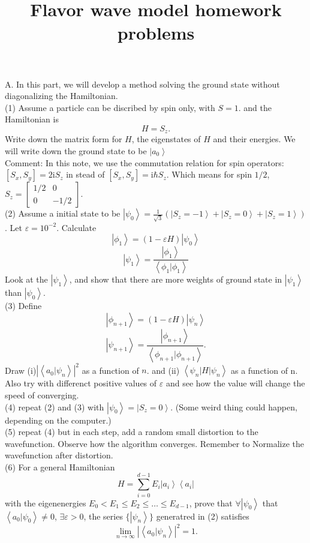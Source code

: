 \documentclass[letter]{article}
\title{{\myfont Flavor wave model homework problems}}
\newcommand{\ii}{\mathrm{i}}
\begin{document}
\maketitle
\indent A. In this part, we will develop a method solving the ground state without diagonalizing the Hamiltonian.\\
\indent (1)  Assume a particle can be discribed by spin only, with $S=1$. and the Hamiltonian is 
$$ H= S_z.
$$
Write down the matrix form for $H$, the eigenstates of $H$ and their energies. We will write down the ground state to be $\left|a_0\right>$\\
\indent Comment: In this note, we use the commutation relation for spin operators: $[S_x,S_y]=2\ii S_z$ in stead of $[S_x,S_y]=\ii \hbar S_z$. Which means for spin $1/2$, $S_z=\begin{bmatrix}
    1/2 & 0 \\
    0 &  -1/2
    \end{bmatrix}$.\\
\indent (2) Assume a initial state to be $\left|\psi_0\right>=\frac{1}{\sqrt{3}}(\left|S_z=-1\right>+\left|S_z=0\right>+\left|S_z=1\right>)$. Let $\varepsilon=10^{-2}$. Calculate 
$$\left|\phi_1\right>=\left(1-\varepsilon H \right)\left|\psi_0\right>$$
$$\left|\psi_1\right>=\frac{\left|\phi_1\right>}{\left<\phi_1|\phi_1\right>}$$
Look at the $\left|\psi_1\right>$, and show that  there are more weights of ground state in $\left|\psi_1\right>$ than $\left|\psi_0\right>$.\\
\indent (3) Define 
$$\left|\phi_{n+1}\right>=\left(1-\varepsilon H\right) \left|\psi_n\right>$$
$$\left|\psi_{n+1}\right>=\frac{\left|\phi_{n+1}\right>}{\left<\phi_{n+1}|\phi_{n+1}\right>}.$$
Draw (i)$\left|\left<a_0|\psi_n\right>\right|^2$ as a function of $n$. and 
(ii) $\left<\psi_n|H|\psi_n\right>$ as a function of n. Also try with differenct positive values of $\varepsilon$ and see how the value will change the speed of converging.\\
\indent (4) repeat (2) and (3) with $\left|\psi_0\right>=\left|S_z=0\right>$. (Some weird thing could happen, depending on the computer.)\\ 
\indent (5) repeat (4) but in each step, add a random small distortion to the wavefunction. Observe how the algorithm converges. Remember to Normalize the wavefunction after distortion.\\ 
\indent (6) For a general Hamiltonian
$$ H = \sum_{i=0}^{d-1} E_{i} \left|a_i\right>\left<a_i\right|
$$
with the eigenenergies $E_0<E_1\leq E_2 \leq \ldots\leq E_{d-1}$, prove that $\forall \left|\psi_0\right> $ that $\left<a_0|\psi_0\right>\neq 0$, $\exists \varepsilon>0$, the series $\{\left| \psi_n\right>\}$ generatred in (2) satisfies $$
\lim_{n\rightarrow\infty} \left|\left<a_0|\psi_n\right>\right|^2=1.
$$
\end{document}
